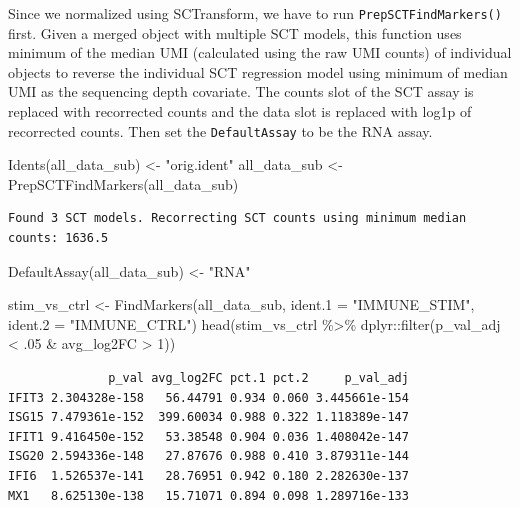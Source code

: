 \documentclass[
  letterpaper,
  DIV=11,
  numbers=noendperiod]{scrreprt}
\newenvironment{Shaded}{\begin{snugshade}}{\end{snugshade}}
\newcommand{\AttributeTok}[1]{\textcolor[rgb]{0.40,0.45,0.13}{#1}}
\newcommand{\DecValTok}[1]{\textcolor[rgb]{0.68,0.00,0.00}{#1}}
\newcommand{\FunctionTok}[1]{\textcolor[rgb]{0.28,0.35,0.67}{#1}}
\newcommand{\NormalTok}[1]{\textcolor[rgb]{0.00,0.23,0.31}{#1}}
\newcommand{\OtherTok}[1]{\textcolor[rgb]{0.00,0.23,0.31}{#1}}
\newcommand{\SpecialCharTok}[1]{\textcolor[rgb]{0.37,0.37,0.37}{#1}}
\newcommand{\StringTok}[1]{\textcolor[rgb]{0.13,0.47,0.30}{#1}}
\begin{document}
Since we normalized using SCTransform, we have to run
\texttt{PrepSCTFindMarkers()} first. Given a merged object with multiple
SCT models, this function uses minimum of the median UMI (calculated
using the raw UMI counts) of individual objects to reverse the
individual SCT regression model using minimum of median UMI as the
sequencing depth covariate. The counts slot of the SCT assay is replaced
with recorrected counts and the data slot is replaced with log1p of
recorrected counts. Then set the \texttt{DefaultAssay} to be the RNA
assay.

\begin{Shaded}
\begin{Highlighting}[]
\FunctionTok{Idents}\NormalTok{(all\_data\_sub) }\OtherTok{\textless{}{-}} \StringTok{"orig.ident"}
\NormalTok{all\_data\_sub }\OtherTok{\textless{}{-}} \FunctionTok{PrepSCTFindMarkers}\NormalTok{(all\_data\_sub)}
\end{Highlighting}
\end{Shaded}

\begin{verbatim}
Found 3 SCT models. Recorrecting SCT counts using minimum median counts: 1636.5
\end{verbatim}

\begin{Shaded}
\begin{Highlighting}[]
\FunctionTok{DefaultAssay}\NormalTok{(all\_data\_sub) }\OtherTok{\textless{}{-}} \StringTok{"RNA"}

\NormalTok{stim\_vs\_ctrl }\OtherTok{\textless{}{-}} \FunctionTok{FindMarkers}\NormalTok{(all\_data\_sub, }\AttributeTok{ident.1 =} \StringTok{"IMMUNE\_STIM"}\NormalTok{, }\AttributeTok{ident.2 =} \StringTok{"IMMUNE\_CTRL"}\NormalTok{)}
\FunctionTok{head}\NormalTok{(stim\_vs\_ctrl }\SpecialCharTok{\%\textgreater{}\%}\NormalTok{ dplyr}\SpecialCharTok{::}\FunctionTok{filter}\NormalTok{(p\_val\_adj }\SpecialCharTok{\textless{}}\NormalTok{ .}\DecValTok{05} \SpecialCharTok{\&}\NormalTok{ avg\_log2FC }\SpecialCharTok{\textgreater{}} \DecValTok{1}\NormalTok{))}
\end{Highlighting}
\end{Shaded}

\begin{verbatim}
              p_val avg_log2FC pct.1 pct.2     p_val_adj
IFIT3 2.304328e-158   56.44791 0.934 0.060 3.445661e-154
ISG15 7.479361e-152  399.60034 0.988 0.322 1.118389e-147
IFIT1 9.416450e-152   53.38548 0.904 0.036 1.408042e-147
ISG20 2.594336e-148   27.87676 0.988 0.410 3.879311e-144
IFI6  1.526537e-141   28.76951 0.942 0.180 2.282630e-137
MX1   8.625130e-138   15.71071 0.894 0.098 1.289716e-133
\end{verbatim}
\end{document}
